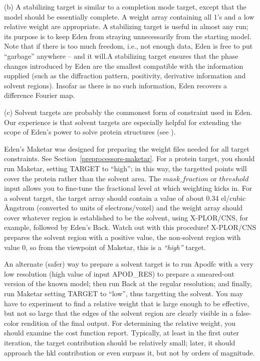 \documentclass{report}
\begin{document}
{\vspace {0.1in}

(b) A stabilizing target is similar to a completion mode target, except that 
the model should be essentially complete.  A weight array containing 
all 1's and a low relative weight are appropriate.  
A stabilizing target is useful in
almost any run; its purpose is to keep Eden from straying unnecessarily from
the starting model. Note that if there is too much freedom, i.e., not enough data,
Eden is free to put ``garbage'' anywhere -- and it will.A stabilizing target
ensures that the phase changes introduced by Eden are 
the smallest compatible with the information supplied 
(such as the diffraction pattern, positivity, derivative information and
solvent regions).  Insofar as there is no such information, Eden recovers a
difference Fourier map.

\vspace {0.1in}

(c) Solvent targets are probably the commonest form of constraint used
in Eden.  Our experience is that solvent targets are especially helpful for 
extending the scope of Eden's power to solve protein structures
(see \cite{eden5}).  

\vspace {0.1in}

Eden's Maketar was designed for preparing the weight files 
needed for all target constraints.  See Section~\ref{preprocessors-maketar}.
For a protein target, you should run Maketar, setting 
TARGET to ``high'';
in this way, the targetted points will 
cover the protein rather than the solvent area.  The $mask\_fraction$ 
or $threshold$ input allows you to fine-tune the fractional level 
at which weighting kicks in.
For a solvent target, the target array
should contain a value of about 0.34 el/cubic \AA ngstrom (converted to units
of electrons/voxel) and the weight array should cover whatever region 
is established to be the solvent,
using X-PLOR/CNS, for example, followed by Eden's 
Back.  Watch out with this procedure! 
X-PLOR/CNS prepares the solvent region
with a positive value, the non-solvent region with value 0, 
so from the viewpoint of Maketar, 
this is a {\em ``high''} target.

\vspace {0.1in}

An alternate (safer) way to prepare a solvent target is to run 
Apodfc with a very low resolution (high value of input 
APOD\_RES) to prepare
a smeared-out version of the known model; then run Back at the 
regular resolution; and finally, run Maketar setting 
TARGET to ``low'', thus targetting the solvent.  
You may have to experiment to find a 
relative weight that is large enough to be effective, but not so large that
the edges of the solvent region are clearly visible in a false-color
rendition of the final output.
For determining the relative weight, you should examine the cost function 
report.  Typically, at least in the first outer iteration, the target 
contribution should be relatively small; later, it should
approach the hkl contribution or even surpass it, but not by orders of
magnitude.

}
\end{document}
